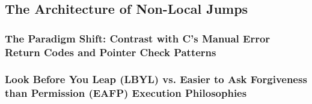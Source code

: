 \subsection{The Architecture of Non-Local Jumps}
\subsubsection{The Paradigm Shift: Contrast with C's Manual Error Return Codes and Pointer Check Patterns}
\subsubsection{Look Before You Leap (LBYL) vs. Easier to Ask Forgiveness than Permission (EAFP) Execution Philosophies}
